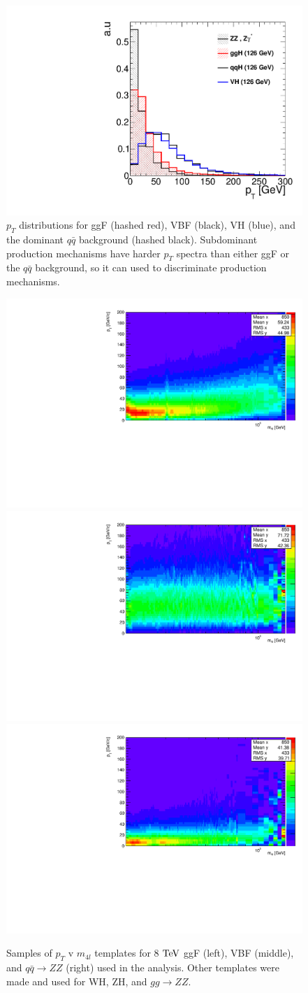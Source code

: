 \begin{figure}[htbp]
\begin{center}
\includegraphics[width=.4\linewidth]{HiggsDiscovery/figures/pt_shape.pdf}
\caption[Transverse Momentum Shapes of Different Higgs Production Mechanisms]{$p_T$ distributions for ggF (hashed red), VBF (black), VH (blue), and the dominant $q\bar{q}$ background (hashed black). Subdominant production mechanisms have harder $p_T$ spectra than either ggF or the $q\bar{q}$ background, so it can used to discriminate production mechanisms.}
\label{fig:HiggspT}
\end{center}
\end{figure}

\begin{figure}[htbp]
\begin{center}
\includegraphics[width=.3\linewidth]{HiggsDiscovery/figures/ptrestricted_ggDefaultTemplate_8TeV.pdf}
\includegraphics[width=.3\linewidth]{HiggsDiscovery/figures/ptrestricted_vbfDefaultTemplate_8TeV.pdf}
\includegraphics[width=.3\linewidth]{HiggsDiscovery/figures/ptrestricted_zzDefaultTemplate_8TeV.pdf}
\caption[Templates of Transverse Momentum for $4l$ Signals and Background]{Samples of $p_T$ v $m_{4l}$ templates for 8 $\rm{TeV}$ ggF (left), VBF (middle), and $q\bar{q}\rightarrow ZZ$ (right) used in the analysis. Other templates were made and used for WH, ZH, and $gg\rightarrow ZZ$.}
\label{fig:pTTemplates}
\end{center}
\end{figure}

